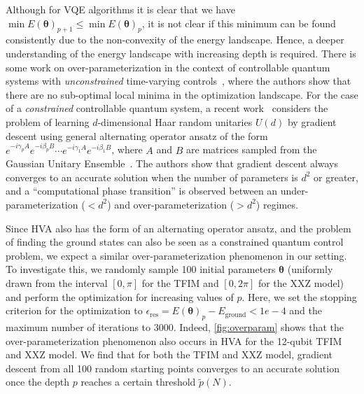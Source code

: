 \documentclass[
 aps,
 pra,
 showpacs,
 showkeys,
 superscriptaddress,
 reprint,%
twocolumn,
]{revtex4-1}
\begin{document}
Although for VQE algorithms it is clear that we have $\min E(\bm{\theta})_{p+1}\leq \min E(\bm{\theta})_{p}$, it is not clear if this minimum can be found consistently due to the non-convexity of the energy landscape. Hence, a deeper understanding of the energy landscape with increasing depth is required. There is some work on over-parameterization in the context of controllable quantum systems with \emph{unconstrained} time-varying controls~\cite{rabitz1998optimalcontrol,rabitz05optimalcontrol, russell2017control}, where the authors show that there are no sub-optimal local minima in the optimization landscape. For the case of a \emph{constrained} controllable quantum system, a recent work~\cite{kiani2020learning} considers the problem of learning $d$-dimensional Haar random unitaries $U(d)$ by gradient descent using general alternating operator ansatz of the form $e^{-i\gamma_p A}e^{-i\beta_p B}\cdots e^{-i\gamma_1 A}e^{-i\beta_1 B}$, where $A$ and $B$ are matrices sampled from the Gaussian Unitary Ensemble~\cite{LalMehta2004irmt}. The authors show that gradient descent always converges to an accurate solution when the number of parameters is $d^2$ or greater, and a ``computational phase transition'' is observed between an under-parameterization ($<d^2$) and over-parameterization ($>d^2$) regimes.

Since HVA also has the form of an alternating operator ansatz, and the problem of finding the ground states can also be seen as a constrained quantum control problem, we expect a similar over-parameterization phenomenon in our setting. To investigate this, we randomly sample 100 initial parameters $\bm{\theta}$ (uniformly drawn from the interval $[0,\pi]$ for the TFIM and $[0,2\pi]$ for the XXZ model) and perform the optimization for increasing values of $p$. Here, we set the stopping criterion for the optimization to $\epsilon_{\text{res}} =E(\bm{\theta})_p- E_{\text{ground}}<1e-4$ and the maximum number of iterations to 3000. Indeed, \cref{fig:overparam} shows that the over-parameterization phenomenon also occurs in HVA for the 12-qubit TFIM and XXZ model. We find that for both the TFIM and XXZ model, gradient descent from all 100 random starting points converges to an accurate solution once the depth $p$ reaches a certain threshold $\tilde{p}(N)$.
\end{document}
